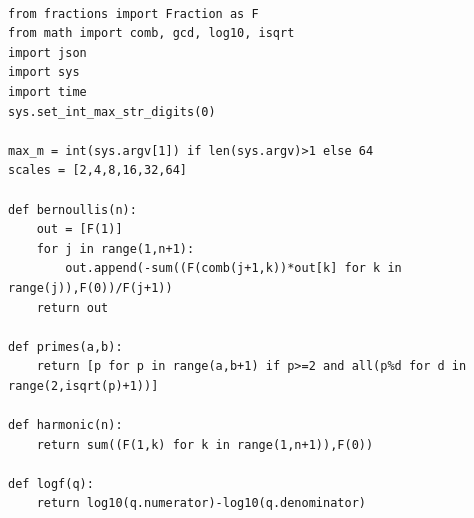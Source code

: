 \documentclass[11pt,a4paper]{article}
\numberwithin{equation}{section}
\theoremstyle{definition}
\theoremstyle{remark}
\begin{document}
\begin{lstlisting}[style=certificate]

from fractions import Fraction as F
from math import comb, gcd, log10, isqrt
import json
import sys
import time
sys.set_int_max_str_digits(0)

max_m = int(sys.argv[1]) if len(sys.argv)>1 else 64
scales = [2,4,8,16,32,64]

def bernoullis(n):
    out = [F(1)]
    for j in range(1,n+1):
        out.append(-sum((F(comb(j+1,k))*out[k] for k in range(j)),F(0))/F(j+1))
    return out

def primes(a,b):
    return [p for p in range(a,b+1) if p>=2 and all(p%d for d in range(2,isqrt(p)+1))]

def harmonic(n):
    return sum((F(1,k) for k in range(1,n+1)),F(0))

def logf(q):
    return log10(q.numerator)-log10(q.denominator)


\end{lstlisting}
\end{document}
